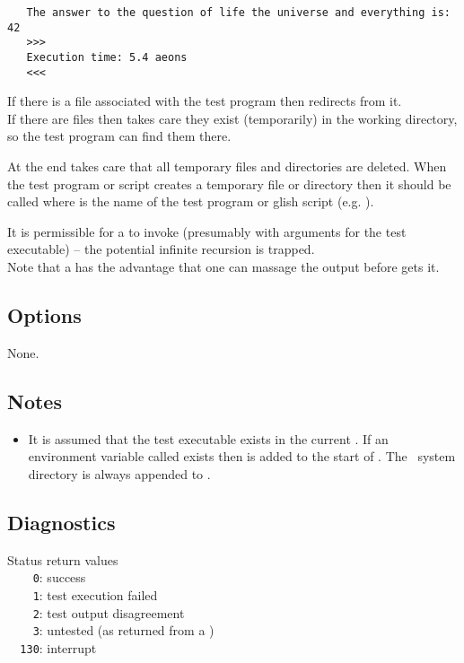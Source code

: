 \begin{verbatim}
   The answer to the question of life the universe and everything is: 42
   >>>
   Execution time: 5.4 aeons
   <<<
\end{verbatim}

If there is a  file associated with the test program then
 redirects  from it.
\\If there are  files then  takes care they
exist (temporarily) in the working directory, so the test program
can find them there.

At the end  takes care that all temporary files and
directories are deleted. When the test program or script creates
a temporary file or directory then it should be called
 where  is the name of the test program
or glish script (e.g. ).

It is permissible for a  to invoke  (presumably with
arguments for the test executable) -- the potential infinite recursion is
trapped.
\\Note that a  has the advantage that one can massage the
output before  gets it.
 
\subsection*{Options}
 
None.
 
\subsection*{Notes}
 
\begin{itemize}
\item
   It is assumed that the test executable exists in the current .
   If an environment variable called  exists then
    is added to the start of .  The \aipspp\
   system  directory is always appended to .
\end{itemize}

\subsection*{Diagnostics}
 
Status return values
\\ \verb+    0+: success
\\ \verb+    1+: test execution failed
\\ \verb+    2+: test output disagreement
\\ \verb+    3+: untested (as returned from a )
\\ \verb+  130+: interrupt

